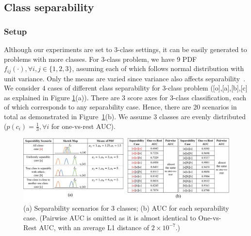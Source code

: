 \documentclass[twoside,11pt]{article}
\renewcommand{\>}{{\rightarrow}}
\newcommand{\1}{{\mathbf 1}}
\newcommand{\0}{{\mathbf 0}}
\begin{document}
\subsection{Class separability}
\subsubsection{Setup}
Although our experiments are set to 3-class settings, it can be easily generated to problems with more classes. For 3-class problem, we have 9 PDF $f_{ij}(\cdot), \forall i,j\in\{1,2,3\}$, assuming each of which follows normal distribution with unit variance.
Only the means are varied since variance also affects separability~\cite{Hand2001}. We consider $4$ cases of different class separability for 3-class problem ([o],[a],[b],[c] as explained in Figure \ref{fig:separability}(a)). 
There are 3 score axes for 3-class classification, each of which corresponds to any separability case. 
Hence, there are 20 scenarios in total as demonstrated in Figure~\ref{fig:separability}(b). We assume 3 classes are evenly distributed ($ p(c_i)=\frac{1}{3}, \forall i$ for one-vs-rest AUC).

\begin{figure}[htb]
    \centering
    \includegraphics[scale=0.36]{pic/separable.pdf}
    \caption{(a) Separability scenarios for 3 classes; (b) AUC for each separability case. (Pairwise AUC is omitted as it is almost identical to One-vs-Rest AUC, with an average L1 distance of $2\times 10^{-7}$.) }
    \label{fig:separability}
\end{figure}
\end{document}
